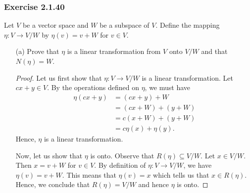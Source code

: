\subsubsection{Exercise 2.1.40} Let \( V  \) be a vector space and \( W  \) be a subspace of \( V  \). Define the mapping \( \eta : V \to V /  W  \) by \( \eta(v) = v + W  \) for \( v \in V  \).
\begin{enumerate}
    \item[(a)] Prove that \( \eta  \) is a linear transformation from \( V  \) onto \( V / W  \) and that \( N(\eta) = W  \).
        \begin{proof}
            Let us first show that \( \eta : V \to V / W   \) is a linear transformation. Let \( cx  + y \in V  \). By the operations defined on \( \eta \), we must have
            \begin{align*}
                \eta(cx+y) &= (cx+y) + W  \\
                           &= (cx+W) + (y + W) \\
                           &= c(x+W) + (y+W) \\
                           &= c \eta(x) + \eta(y).
            \end{align*}
            Hence, \( \eta \) is a linear transformation.

            Now, let us show that \( \eta  \) is onto. Observe that \( R(\eta) \subseteq V / W  \). Let \( x \in V / W  \). Then \( x = v + W  \) for \( v \in V  \). By definition of \( \eta: V \to V / W   \), we have \( \eta(v) = v + W  \). This means that \( \eta(v) = x  \) which tells us that \( x \in R(\eta) \). Hence, we conclude that \( R(\eta) = V / W   \) and hence \( \eta  \) is onto.


\end{proof}
\end{enumerate}
